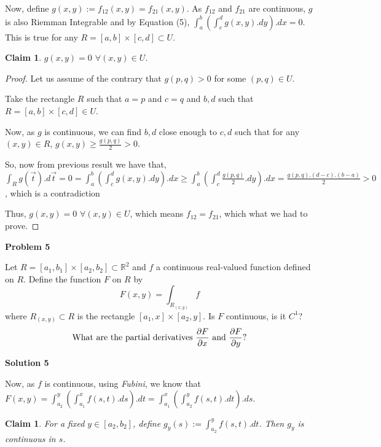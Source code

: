 \documentclass[12pt,a4paper]{article}
\newtheorem{claim}[theorem]{Claim}
\theoremstyle{definition}
\begin{document}
\begin{flushleft}
\medskip

Now, define $g(x,y):= f_{12} (x,y) = f_{21} (x,y)$. As $f_{12}$ and $f_{21}$ are continuous, $g$ is also Riemman Integrable and by Equation (5), $\int_{a}^{b}(\int_{c}^{d} g (x,y).dy).dx = 0$. This is true for any $R = [a,b] \times [c,d] \subset U$.

\newpage

\begin{claim}
	$g(x,y) = 0$ $\forall (x,y) \in U$.
\end{claim}

\begin{proof}
	Let us assume of the contrary that $g(p,q) > 0$ for some $(p,q) \in U$.

	Take the rectangle $R$ such that $a = p$ and $c = q$ and $b,d$ such that $R = [a,b] \times [c,d] \in U$. 

	Now, as $g$ is continuous, we can find $b,d$ close enough to $c,d$ such that for any $(x,y) \in R$, $g(x,y) \ge \frac{g(p,q)}{2} > 0$.

	So, now from previous result we have that, $\int_{R} g(\vec{t}).d\vec{t} = 0 = \int_{a}^{b}(\int_{c}^{d} g (x,y).dy).dx \ge \int_{a}^{b}(\int_{c}^{d} \frac{g(p,q)}{2}.dy).dx = \frac{g(p,q).(d-c).(b-a)}{2} > 0$, which is a contradiction

	\medskip

	Thus, $g(x,y) = 0$ $\forall (x,y) \in U$, which means $f_{12} = f_{21}$, which what we had to prove.
\end{proof}

\newpage

{\bf  Problem 5}

Let $R=[a_1,b_1] \times [a_2,b_2] \subset \mathbb{R}^2$ and $f$ a continuous real-valued function defined on $R$. Define the function $F$ on $R$ by
\[
F(x,y)=\int_{R_{(x,y)}} f
\]
where $R_{(x,y)} \subset R$ is the rectangle $[a_1,x] \times [a_2,y]$. Is $F$ continuous, is it $C^1$? 
\[
\textup{What are the partial derivatives $\frac{\partial F}{ \partial x}$ and $\frac{\partial F}{ \partial y}$?}
\]

\bigskip

{\bf Solution 5}

\medskip

Now, as $f$ is continuous, using {\it Fubini}, we know that $F(x,y) = \int_{a_2}^{y} (\int_{a_1}^{x} f(s,t).ds).dt = \int_{a_1}^{x} (\int_{a_2}^{y} f(s,t).dt).ds$.

\begin{claim}
	For a fixed $y \in [a_2,b_2]$, define $g_y (s) := \int_{a_2}^{y} f(s,t).dt$. Then $g_y$ is continuous in $s$.
\end{claim}


\end{flushleft}
\end{document}
